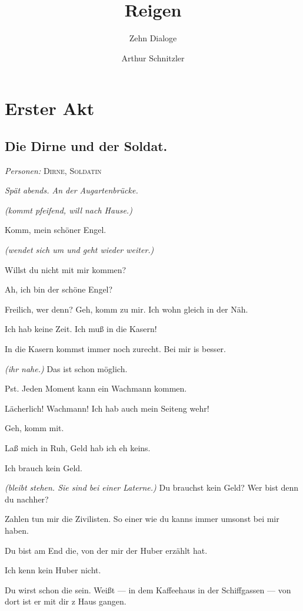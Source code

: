 \documentclass[
	final,
	a4paper,
	ngerman,
	mpinclude = true, %
	twoside = true,
	open = right,
	cleardoublepage = plain,
	DIV = 13,
	BCOR = 1cm,
	titlepage = firstiscover,
	]{scrbook}
\title{Reigen}
\subtitle{Zehn Dialoge}
\author{Arthur Schnitzler}
\date{\ifdirectorsversion{--- Regie-Version ---}{}}
\newcommand{\act}{\chapter}
\newcommand{\scene}{\section}
\newcommand{\direction}[1]{\textit{(#1)}}
\newcommand{\setting}[1]{\vspace{-0.5\baselineskip}\centering\textit{#1}}
\newcommand{\characterlist}[1]{{\begin{center}\textit{Personen:} #1\end{center}}}
\newcommand{\thecharacter}[1]{\textup{\textsc{#1}}\xspace}
\newcommand{\thedirne}{\thecharacter{Dirne}}
\newcommand{\thesoldat}{\thecharacter{Soldatin}}
\newcommand{\character}[1]{\item[#1:]}
\newcommand{\dirne}{\character{\thedirne}}
\newcommand{\soldat}{\character{\thesoldat}}
\begin{document}

\cleardoubleoddemptypage

\maketitle

\tableofcontents
\cleardoubleoddpage

\pagestyle{headings}
\doublespacing

\act{Erster Akt}
\scene{Die Dirne und der Soldat.}
\characterlist{\thedirne, \thesoldat}
\setting{Spät abends. An der Augartenbrücke.}
\begin{play}
	\soldat
	\direction{kommt pfeifend, will nach Hause.}

	\dirne
	Komm, mein schöner Engel.

	\soldat
	\direction{wendet sich um und geht wieder weiter.}

	\dirne
	Willst du nicht mit mir kommen?

	\soldat
	Ah, ich bin der schöne Engel?

	\dirne
	Freilich, wer denn? Geh, komm zu mir. Ich wohn gleich in der Näh.

	\soldat
	Ich hab keine Zeit. Ich muß in die Kasern!

	\dirne
	In die Kasern kommst immer noch zurecht. Bei mir is besser.

	\soldat
	\direction{ihr nahe.} Das ist schon möglich.

	\dirne
	Pst. Jeden Moment kann ein Wachmann kommen.

	\soldat
	Lächerlich! Wachmann! Ich hab auch mein Seiteng wehr!

	\dirne
	Geh, komm mit.

	\soldat
	Laß mich in Ruh, Geld hab ich eh keins.

	\dirne
	Ich brauch kein Geld.

	\soldat
	\direction{bleibt stehen. Sie sind bei einer Laterne.} Du brauchst kein Geld? Wer bist denn du nachher?

	\dirne
	Zahlen tun mir die Zivilisten. So einer wie du kanns immer umsonst bei mir haben.

	\soldat
	Du bist am End die, von der mir der Huber erzählt hat.

	\dirne
	Ich kenn kein Huber nicht.

	\soldat
	Du wirst schon die sein. Weißt --- in dem Kaffeehaus in der Schiffgassen --- von dort ist er mit dir z Haus gangen.


\end{play}
\end{document}
